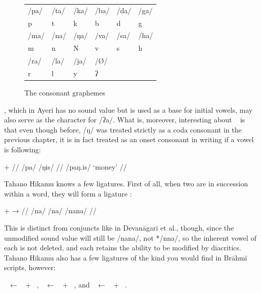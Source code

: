 \begin{figure}[ht]
\caption{The consonant graphemes}

\begin{tabu} to \linewidth{X[c] X[c] X[c] X[c] X[c] X[c]}
\toprule
\tableheaderfont	/pa/ & /ta/ & /ka/ & /ba/ & /da/ & /ga/ \\
\rowfont{\Tagati\huge}	p & t & k & b & d & g \\

\midrule

\tableheaderfont	/ma/ & /na/ & /ŋa/ & /va/ & /sa/ & /ha/ \\
\rowfont{\Tagati\huge}	m & n & N & v & s & h \\

\midrule

\tableheaderfont	/ra/ & /la/ & /ja/ & /Ø/ \\
\rowfont{\Tagati\huge}	r & l & y & ʔ \\

\bottomrule
\end{tabu}
\label{fig:thcons}
\end{figure}

, which in Ayeri has no sound value but is used as a base for initial 
vowels, may also serve as the character for /ʔa/. What is, moreover, 
interesting about ~ is that even though before, /ŋ/ was 
treated 
strictly as a coda consonant in the previous chapter, it is in fact treated as 
an onset consonant in writing if a vowel is following:

\ex[lingstyle=thex]\begingl
	\gla {}	$+$	 //
	\glb /pa/	{}	/ŋis/ //
	\glft {} /paŋ.is/ `money' //
\endgl\xe

Tahano Hikamu knows a few ligatures. First of all, when two   
are in succession within a word, they will form a ligature  :

\ex[lingstyle=thex]\begingl
	\gla {}	$+$		→	 //
	\glb /na/	{}	/na/	{}	/nana/ //
\endgl\xe

\noindent This is distinct from conjuncts like in Devanāgarī et al., though, 
since the unmodified sound value will still be /nana/, not */nna/, so the 
inherent vowel of each   is not deleted, and each  
 retains the ability to be modified by diacritics. Tahano Hikamu also 
has a few ligatures of the kind you would find in Brāhmī scripts, however:

\pex
	\a {}~ ← ~ + 
		~,
	\a {}~ ← ~ + 
		~, and 
	\a {}~ ← ~ + 
		~.
\xe

